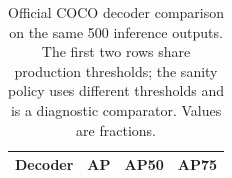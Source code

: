 \begin{table}[htbp]
\centering\small\TableSetup
\caption{Official COCO decoder comparison on the same 500 inference outputs. The first two rows share production thresholds; the sanity policy uses different thresholds and is a diagnostic comparator. Values are fractions.}
\label{tab:evaluation:yolov7_decoder_ab}
\begin{tabularx}{\linewidth}{@{}Y S[table-format=1.3] S[table-format=1.3] S[table-format=1.3]@{}}
\toprule
\textbf{Decoder} & {\textbf{AP}} & {\textbf{AP50}} & {\textbf{AP75}} \\
\midrule
\bottomrule
\end{tabularx}
\end{table}
